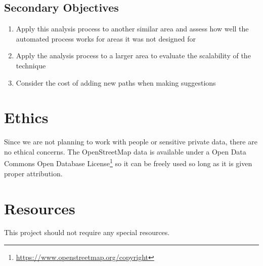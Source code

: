 \documentclass{article}
\begin{document}
\subsection{Secondary Objectives}
\begin{enumerate}
    \item Apply this analysis process to another similar area and assess how well the automated process works for areas it was not designed for
    \item Apply the analysis process to a larger area to evaluate the scalability of the technique
    \item Consider the cost of adding new paths when making suggestions
\end{enumerate}

\section{Ethics}
Since we are not planning to work with people or sensitive private data, there are no ethical concerns. The OpenStreetMap data is available under a Open Data Commons Open Database License\footnote{\url{https://www.openstreetmap.org/copyright}} so it can be freely used so long as it is given proper attribution.

\section{Resources}
This project should not require any special resources.
\end{document}
